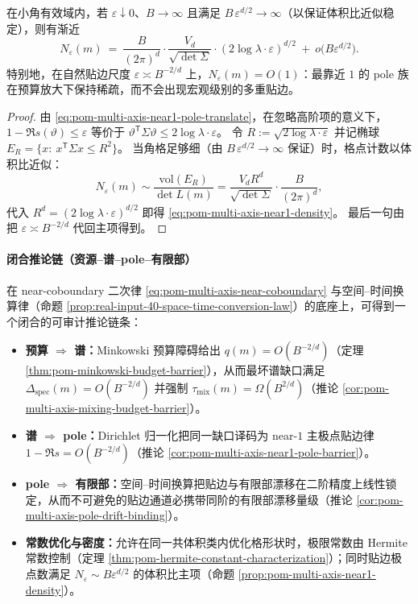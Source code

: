 \begin{proposition}[贴边极点计数主项]\label{prop:pom-multi-axis-near1-density}
在小角有效域内，若 \(\varepsilon\downarrow 0\)、\(B\to\infty\) 且满足 \(B\,\varepsilon^{d/2}\to\infty\)（以保证体积比近似稳定），则有渐近
\begin{equation}\label{eq:pom-multi-axis-near1-density}
N_{\varepsilon}(m)
\ =\
\frac{B}{(2\pi)^{d}}\cdot\frac{V_{d}}{\sqrt{\det\Sigma}}\cdot(2\log\lambda\cdot\varepsilon)^{d/2}
\ +\ o\!\bigl(B\varepsilon^{d/2}\bigr).
\end{equation}
特别地，在自然贴边尺度 \(\varepsilon\asymp B^{-2/d}\) 上，\(N_\varepsilon(m)=O(1)\)：最靠近 \(1\) 的 pole 族在预算放大下保持稀疏，而不会出现宏观级别的多重贴边。
\end{proposition}

\begin{proof}
由 \eqref{eq:pom-multi-axis-near1-pole-translate}，在忽略高阶项的意义下，
\(
1-\Re s(\vartheta)\le \varepsilon
\)
等价于
\(
\vartheta^{\mathsf T}\Sigma\vartheta\le 2\log\lambda\cdot\varepsilon
\)。
令 \(R:=\sqrt{2\log\lambda\cdot\varepsilon}\) 并记椭球 \(E_R=\{x:\ x^{\mathsf T}\Sigma x\le R^2\}\)。
当角格足够细（由 \(B\,\varepsilon^{d/2}\to\infty\) 保证）时，格点计数以体积比近似：
\[
N_\varepsilon(m)
\sim
\frac{\mathrm{vol}(E_R)}{\det L(m)}
=\frac{V_d R^d}{\sqrt{\det\Sigma}}\cdot\frac{B}{(2\pi)^d},
\]
代入 \(R^d=(2\log\lambda\cdot\varepsilon)^{d/2}\) 即得 \eqref{eq:pom-multi-axis-near1-density}。
最后一句由把 \(\varepsilon\asymp B^{-2/d}\) 代回主项得到。
\end{proof}

\paragraph{闭合推论链（资源--谱--pole--有限部）}
在 near-coboundary 二次律 \eqref{eq:pom-multi-axis-near-coboundary} 与空间--时间换算律（命题 \ref{prop:real-input-40-space-time-conversion-law}）的底座上，可得到一个闭合的可审计推论链条：
\begin{itemize}
  \item \textbf{预算 \(\Rightarrow\) 谱：}Minkowski 预算障碍给出 \(q(m)=O(B^{-2/d})\)（定理 \ref{thm:pom-minkowski-budget-barrier}），从而最坏谱缺口满足 \(\Delta_{\mathrm{spec}}(m)=O(B^{-2/d})\) 并强制 \(\tau_{\mathrm{mix}}(m)=\Omega(B^{2/d})\)（推论 \ref{cor:pom-multi-axis-mixing-budget-barrier}）。
  \item \textbf{谱 \(\Rightarrow\) pole：}Dirichlet 归一化把同一缺口译码为 near-\(1\) 主极点贴边律 \(1-\Re s=O(B^{-2/d})\)（推论 \ref{cor:pom-multi-axis-near1-pole-barrier}）。
  \item \textbf{pole \(\Rightarrow\) 有限部：}空间--时间换算把贴边与有限部漂移在二阶精度上线性锁定，从而不可避免的贴边通道必携带同阶的有限部漂移量级（推论 \ref{cor:pom-multi-axis-pole-drift-binding}）。
  \item \textbf{常数优化与密度：}允许在同一共体积类内优化格形状时，极限常数由 Hermite 常数控制（定理 \ref{thm:pom-hermite-constant-characterization}）；同时贴边极点数满足 \(N_\varepsilon\sim B\varepsilon^{d/2}\) 的体积比主项（命题 \ref{prop:pom-multi-axis-near1-density}）。
\end{itemize}



